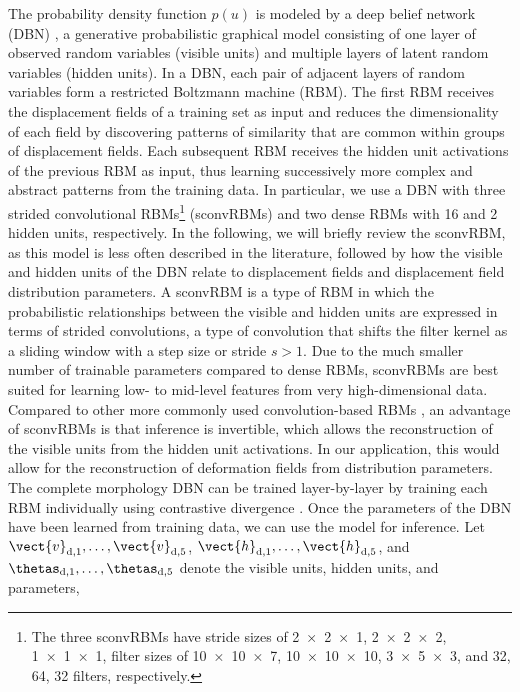 The probability density function $p(u)$ is modeled by a deep belief network
(DBN) \cite{Hinton2006b}, a generative probabilistic graphical model consisting
of one layer of observed random variables (visible units) and multiple layers of
latent random variables (hidden units). In a DBN, each pair of adjacent layers
of random variables form a restricted Boltzmann machine (RBM). The first RBM
receives the displacement fields of a training set as input and reduces the
dimensionality of each field by discovering patterns of similarity that are
common within groups of displacement fields. Each subsequent RBM receives the
hidden unit activations of the previous RBM as input, thus learning successively
more complex and abstract patterns from the training data. In particular, we use
a DBN with three strided convolutional RBMs\footnote{The three sconvRBMs have
stride sizes of \num{2x2x1}, \num{2x2x2}, \num{1x1x1}, filter sizes of
\num{10x10x7}, \num{10x10x10}, \num{3x5x3}, and 32, 64, 32 filters,
respectively.} (sconvRBMs) and two dense RBMs \cite{Hinton2010} with 16 and 2
hidden units, respectively. In the following, we will briefly review the
sconvRBM, as this model is less often described in the literature, followed by
how the visible and hidden units of the DBN relate to displacement fields and
displacement field distribution parameters. A sconvRBM is a type of RBM in which
the probabilistic relationships between the visible and hidden units are
expressed in terms of strided convolutions, a type of convolution that shifts
the filter kernel as a sliding window with a step size or stride $s > 1$. Due to
the much smaller number of trainable parameters compared to dense RBMs,
sconvRBMs are best suited for learning low- to mid-level features from very
high-dimensional data. Compared to other more commonly used convolution-based
RBMs \cite{Lee2009}, an advantage of sconvRBMs is that inference is invertible,
which allows the reconstruction of the visible units from the hidden unit
activations. In our application, this would allow for the reconstruction of
deformation fields from distribution parameters. The complete morphology DBN can
be trained layer-by-layer by training each RBM individually using contrastive
divergence \cite{Hinton2006b}. Once the parameters of the DBN have been learned
from training data, we can use the model for inference. Let
$\vect{v}_{\text{d},1}, \dotsc, \vect{v}_{\text{d},5}$, $\vect{h}_{\text{d},1},
\dotsc, \vect{h}_{\text{d},5}$, and $\thetas_{\text{d},1}, \dotsc,
\thetas_{\text{d},5}$ denote the visible units, hidden units, and parameters,

